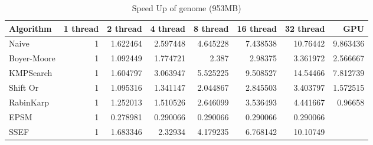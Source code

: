 \documentclass[11pt]{article}       %
\begin{document}
\begin{table}[htbp]
  \centering
  \caption{Speed Up of genome (953MB)}
    \begin{tabular}{lrrrrrrr}\label{t8}
Algorithm & 1 thread & 2 thread & 4 thread & 8 thread & 16 thread & 32 thread & GPU \\
 \hline
    Naive & 1     & 1.622464 & 2.597448 & 4.645228 & 7.438538 & 10.76442 & 9.863436 \\
    Boyer-Moore & 1     & 1.092449 & 1.774721 & 2.387 & 2.98375 & 3.361972 & 2.566667 \\
    KMPSearch & 1     & 1.604797 & 3.063947 & 5.525225 & 9.508527 & 14.54466 & 7.812739 \\
    Shift Or & 1     & 1.095316 & 1.341147 & 2.044867 & 2.845503 & 3.403797 & 1.572515 \\
    RabinKarp & 1     & 1.252013 & 1.510526 & 2.646099 & 3.536493 & 4.441667 & 0.96658 \\
    EPSM  & 1     & 0.278981 & 0.290066 & 0.290066 & 0.290066 & 0.290066 &  \\
    SSEF  & 1     & 1.683346 & 2.32934 & 4.179235 & 6.768142 & 10.10749 &  \\

    \end{tabular}%
  \label{tab:addlabel}%
\end{table}%
\end{document}
